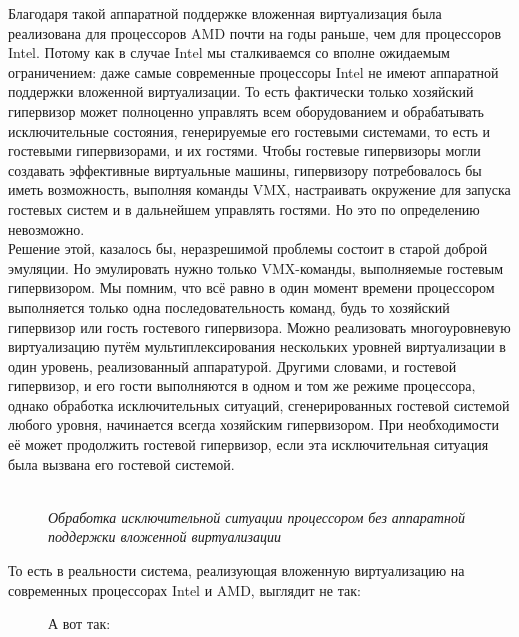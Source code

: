 \documentclass[14pt, a4paper]{article}
\begin{document}
Благодаря такой аппаратной поддержке вложенная виртуализация была реализована для
процессоров AMD почти на годы раньше, чем для процессоров Intel. Потому как в случае Intel мы
сталкиваемся со вполне ожидаемым ограничением: даже самые современные процессоры Intel не
имеют аппаратной поддержки вложенной виртуализации. То есть фактически только хозяйский
гипервизор может полноценно управлять всем оборудованием и обрабатывать исключительные
состояния, генерируемые его гостевыми системами, то есть и гостевыми гипервизорами, и их гостями.
Чтобы гостевые гипервизоры могли создавать эффективные виртуальные машины, гипервизору
потребовалось бы иметь возможность, выполняя команды VMX, настраивать окружение для запуска
гостевых систем и в дальнейшем управлять гостями. Но это по определению невозможно.\\

Решение этой, казалось бы, неразрешимой проблемы состоит в старой доброй эмуляции. Но
эмулировать нужно только VMX-команды, выполняемые гостевым гипервизором. Мы помним, что всё
равно в один момент времени процессором выполняется только одна последовательность команд,
будь то хозяйский гипервизор или гость гостевого гипервизора. Можно реализовать многоуровневую
виртуализацию путём мультиплексирования нескольких уровней виртуализации в один уровень,
реализованный аппаратурой. Другими словами, и гостевой гипервизор, и его гости выполняются в
одном и том же режиме процессора, однако обработка исключительных ситуаций, сгенерированных
гостевой системой любого уровня, начинается всегда хозяйским гипервизором. При необходимости её
может продолжить гостевой гипервизор, если эта исключительная ситуация была вызвана его
гостевой системой.\\

\begin{figure}[h]
    \centering
    \\
    \small\textit{Обработка исключительной ситуации процессором без аппаратной поддержки вложенной виртуализации}
    \label{framework} 
\end{figure}

То есть в реальности система, реализующая вложенную виртуализацию на современных процессорах
Intel и AMD, выглядит не так:

\newpage

\begin{figure}[h]
    \label{framework} 
\end{figure}
\vspace{-0.7cm}
\begin{figure}[h]
    А вот так:\\

    \label{framework} 
\end{figure}
\end{document}
